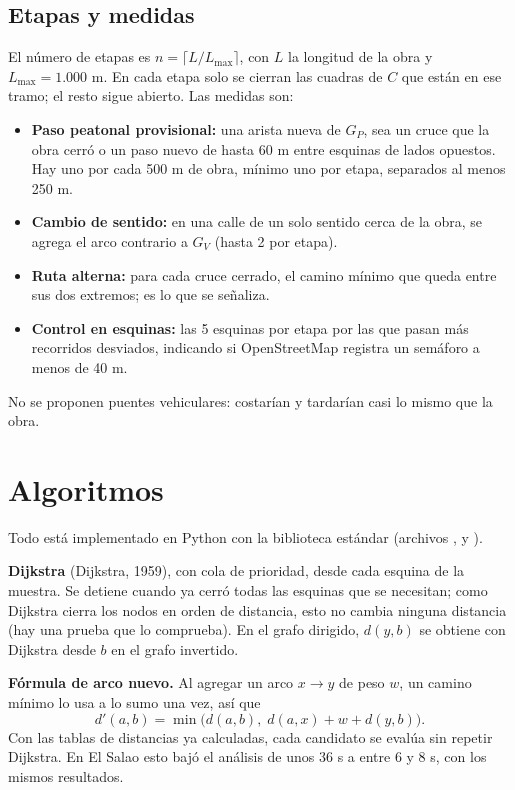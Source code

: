 \documentclass[12pt,letterpaper]{article}
\begin{document}
\subsection{Etapas y medidas}
El número de etapas es $n=\lceil L/L_{\max}\rceil$, con $L$ la longitud de la obra y $L_{\max}=1.000$ m. En cada etapa solo se cierran las cuadras de $C$ que están en ese tramo; el resto sigue abierto. Las medidas son:
\begin{itemize}
\item \textbf{Paso peatonal provisional:} una arista nueva de $G_P$, sea un cruce que la obra cerró o un paso nuevo de hasta 60 m entre esquinas de lados opuestos. Hay uno por cada 500 m de obra, mínimo uno por etapa, separados al menos 250 m.
\item \textbf{Cambio de sentido:} en una calle de un solo sentido cerca de la obra, se agrega el arco contrario a $G_V$ (hasta 2 por etapa).
\item \textbf{Ruta alterna:} para cada cruce cerrado, el camino mínimo que queda entre sus dos extremos; es lo que se señaliza.
\item \textbf{Control en esquinas:} las 5 esquinas por etapa por las que pasan más recorridos desviados, indicando si OpenStreetMap registra un semáforo a menos de 40 m.
\end{itemize}
No se proponen puentes vehiculares: costarían y tardarían casi lo mismo que la obra.

\section{Algoritmos}
Todo está implementado en Python con la biblioteca estándar (archivos ,  y ).

\textbf{Dijkstra} (Dijkstra, 1959), con cola de prioridad, desde cada esquina de la muestra. Se detiene cuando ya cerró todas las esquinas que se necesitan; como Dijkstra cierra los nodos en orden de distancia, esto no cambia ninguna distancia (hay una prueba que lo comprueba). En el grafo dirigido, $d(y,b)$ se obtiene con Dijkstra desde $b$ en el grafo invertido.

\textbf{Fórmula de arco nuevo.} Al agregar un arco $x\to y$ de peso $w$, un camino mínimo lo usa a lo sumo una vez, así que
\begin{equation}
d'(a,b)=\min\bigl(d(a,b),\; d(a,x)+w+d(y,b)\bigr).
\end{equation}
Con las tablas de distancias ya calculadas, cada candidato se evalúa sin repetir Dijkstra. En El Salao esto bajó el análisis de unos 36 s a entre 6 y 8 s, con los mismos resultados.
\end{document}
